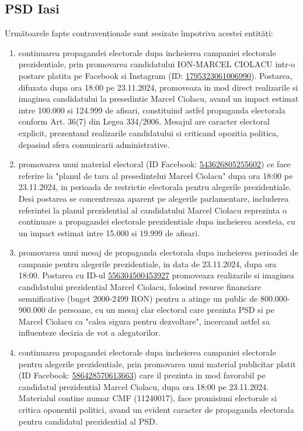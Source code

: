 \documentclass[a4paper,12pt]{article}
\begin{document}
\subsection{PSD Iasi}
Următoarele fapte contravenționale sunt sesizate împotriva acestei entități:

\begin{enumerate}[leftmargin=*, label=\arabic*.)]
    \item continuarea propagandei electorale dupa incheierea campaniei electorale prezidentiale, prin promovarea candidatului ION-MARCEL CIOLACU intr-o postare platita pe Facebook si Instagram (ID: \href{https://www.facebook.com/ads/library/?id=1795323061006990}{1795323061006990}). Postarea, difuzata dupa ora 18:00 pe 23.11.2024, promoveaza in mod direct realizarile si imaginea candidatului la presedintie Marcel Ciolacu, avand un impact estimat intre 100.000 si 124.999 de afisari, constituind astfel propaganda electorala conform Art. 36(7) din Legea 334/2006. Mesajul are caracter electoral explicit, prezentand realizarile candidatului si criticand opozitia politica, depasind sfera comunicarii administrative.
    \item promovarea unui material electoral (ID Facebook: \href{https://www.facebook.com/ads/library/?id=543626805255602}{543626805255602}) ce face referire la "planul de tara al presedintelui Marcel Ciolacu" dupa ora 18:00 pe 23.11.2024, in perioada de restrictie electorala pentru alegerile prezidentiale. Desi postarea se concentreaza aparent pe alegerile parlamentare, includerea referintei la planul prezidential al candidatului Marcel Ciolacu reprezinta o continuare a propagandei electorale prezidentiale dupa incheierea acesteia, cu un impact estimat intre 15.000 si 19.999 de afisari.
    \item promovarea unui mesaj de propaganda electorala dupa incheierea perioadei de campanie pentru alegerile prezidentiale, in data de 23.11.2024, dupa ora 18:00. Postarea cu ID-ul \href{https://www.facebook.com/ads/library/?id=556304500453927}{556304500453927} promoveaza realizarile si imaginea candidatului prezidential Marcel Ciolacu, folosind resurse financiare semnificative (buget 2000-2499 RON) pentru a atinge un public de 800.000-900.000 de persoane, cu un mesaj clar electoral care prezinta PSD si pe Marcel Ciolacu ca "calea sigura pentru dezvoltare", incercand astfel sa influenteze decizia de vot a alegatorilor.
    \item continuarea propagandei electorale dupa incheierea campaniei electorale pentru alegerile prezidentiale, prin promovarea unui material publicitar platit (ID Facebook: \href{https://www.facebook.com/ads/library/?id=586428570613663}{586428570613663}) care il prezinta in mod favorabil pe candidatul prezidential Marcel Ciolacu, dupa ora 18:00 pe 23.11.2024. Materialul contine numar CMF (11240017), face promisiuni electorale si critica oponentii politici, avand un evident caracter de propaganda electorala pentru candidatul prezidential al PSD.

\end{enumerate}
\end{document}
